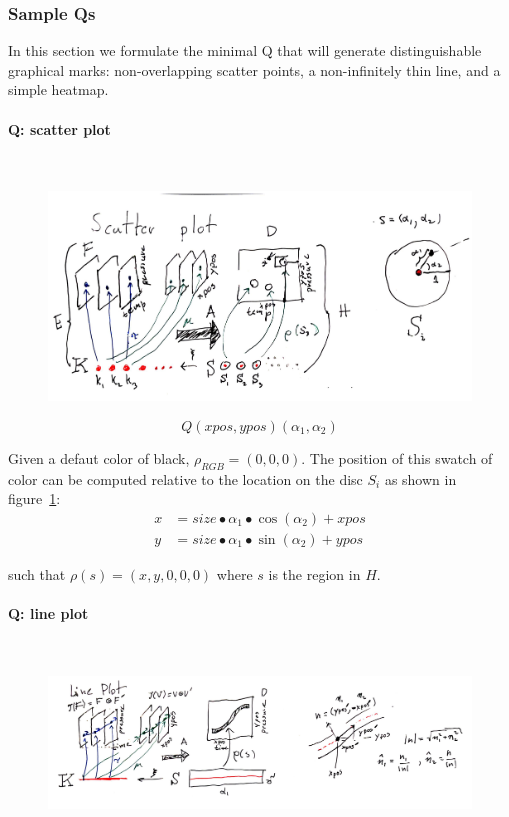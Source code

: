 \documentclass[../main.tex]{subfiles}
\begin{document}
\subsubsection{Sample Qs}
In this section we formulate the minimal Q that will generate distinguishable graphical marks: non-overlapping scatter points, a non-infinitely thin line, and a simple heatmap. 

\paragraph{Q: scatter plot}\mbox{} \\
\label{sec:artist_example_scatter}
\begin{figure}[ht!]
    \includegraphics[width=\textwidth]{figures/math/scatter.png}
    \label{fig:artist_scatter}
\end{figure}

\begin{equation}
Q(xpos, ypos)(\alpha_{1}, \alpha_{2}) 
\end{equation}

Given a defaut color of black, $\rho_{RGB} = (0,0,0)$. The position of this swatch of color can be computed relative to the location on the disc $S_{i}$ as shown in figure~\ref{fig:artist_scatter}:
\begin{align}
x &= size\bullet \alpha_1 \bullet \cos(\alpha_2) + xpos\\
y &= size\bullet \alpha_1 \bullet \sin(\alpha_2) + ypos
\end{align}

such that $\rho(s) = (x, y, 0, 0, 0)$ where $s$ is the region in $H$. 

\paragraph{Q: line plot}\mbox{} \\
\label{sec:artist_example_line}
\begin{figure}[ht!]
    \includegraphics[width=\textwidth]{figures/math/line.png}
    \label{fig:artist_line}
\end{figure}
\end{document}
